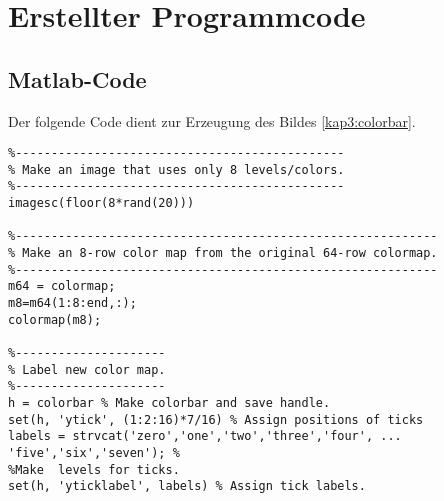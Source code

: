 
\chapter[Erstellter Programmcode]{Erstellter Programmcode}

\section{Matlab-Code}
Der folgende Code dient zur Erzeugung des Bildes \ref{kap3:colorbar}.
\begin{verbatim}
%----------------------------------------------
% Make an image that uses only 8 levels/colors.
%----------------------------------------------
imagesc(floor(8*rand(20)))

%-----------------------------------------------------------
% Make an 8-row color map from the original 64-row colormap.
%-----------------------------------------------------------
m64 = colormap;
m8=m64(1:8:end,:);
colormap(m8);

%---------------------
% Label new color map.
%---------------------
h = colorbar % Make colorbar and save handle.
set(h, 'ytick', (1:2:16)*7/16) % Assign positions of ticks
labels = strvcat('zero','one','two','three','four', ...
'five','six','seven'); %
%Make  levels for ticks.
set(h, 'yticklabel', labels) % Assign tick labels.
\end{verbatim}